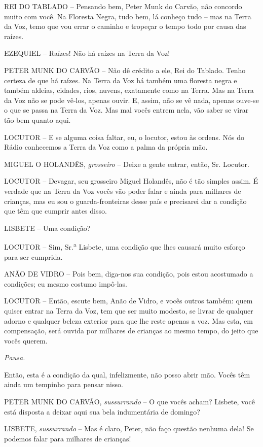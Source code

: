 REI DO TABLADO -- Pensando bem, Peter Munk do Carvão, não concordo muito
com você. Na Floresta Negra, tudo bem, lá conheço tudo -- mas na Terra
da Voz, temo que vou errar o caminho e tropeçar o tempo todo por causa
das raízes.

EZEQUIEL -- Raízes! Não há raízes na Terra da Voz!

PETER MUNK DO CARVÃO -- Não dê crédito a ele, Rei do Tablado. Tenho
certeza de que há raízes. Na Terra da Voz há também uma floresta negra e
também aldeias, cidades, rios, nuvens, exatamente como na Terra. Mas na
Terra da Voz não se pode vê-los, apenas ouvir. E, assim, não se vê nada,
apenas ouve-se o que se passa na Terra da Voz. Mas mal vocês entrem
nela, vão saber se virar tão bem quanto aqui.

LOCUTOR -- E se alguma coisa faltar, eu, o locutor, estou às ordens. Nós
do Rádio conhecemos a Terra da Voz como a palma da própria mão.

MIGUEL O HOLANDÊS, \emph{grosseiro} -- Deixe a gente entrar, então, Sr.
Locutor.

LOCUTOR -- Devagar, seu grosseiro Miguel Holandês, não é tão simples
assim. É verdade que na Terra da Voz vocês vão poder falar e ainda para
milhares de crianças, mas eu sou o guarda-fronteiras desse país e
precisarei dar a condição que têm que cumprir antes disso.

LISBETE -- Uma condição?

LOCUTOR -- Sim, Sr.\textsuperscript{a} Lisbete, uma condição que lhes
causará muito esforço para ser cumprida.

ANÃO DE VIDRO -- Pois bem, diga-nos sua condição, pois estou acostumado
a condições; eu mesmo costumo impô-las.

LOCUTOR -- Então, escute bem, Anão de Vidro, e vocês outros também: quem
quiser entrar na Terra da Voz, tem que ser muito modesto, se livrar de
qualquer adorno e qualquer beleza exterior para que lhe reste apenas a
voz. Mas esta, em compensação, será ouvida por milhares de crianças ao
mesmo tempo, do jeito que vocês querem.

\emph{Pausa.}

Então, esta é a condição da qual, infelizmente, não posso abrir mão.
Vocês têm ainda um tempinho para pensar nisso.

PETER MUNK DO CARVÃO, \emph{sussurrando} -- O que vocês acham? Lisbete,
você está disposta a deixar aqui sua bela indumentária de domingo?

LISBETE, \emph{sussurrando} -- Mas é claro, Peter, não faço questão
nenhuma dela! Se podemos falar para milhares de crianças!

